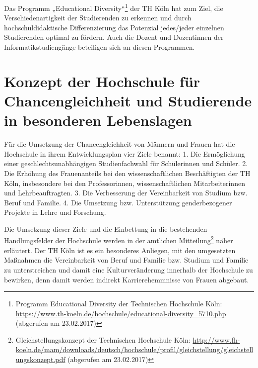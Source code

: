 Das Programm „Educational Diversity``\footnote{Programm Educational
  Diversity der Technischen Hochschule Köln:
  \url{https://www.th-koeln.de/hochschule/educational-diversity\_5710.php}
  (abgerufen am 23.02.2017)} der TH Köln hat zum Ziel, die
Verschiedenartigkeit der Studierenden zu erkennen und durch
hochschuldidaktische Differenzierung das Potenzial jedes/jeder einzelnen
Studierenden optimal zu fördern. Auch die Dozent und Dozentinnen der
Informatikstudiengänge beteiligen sich an diesen Programmen.

\section{Konzept der Hochschule für Chancengleichheit und Studierende
in besonderen
Lebenslagen}\label{konzept-der-hochschule-fuxfcr-chancengleichheit-und-studierende-in-besonderen-lebenslagen}

Für die Umsetzung der Chancengleichheit von Männern und Frauen hat die
Hochschule in ihrem Entwicklungsplan vier Ziele benannt: 1. Die
Ermöglichung einer geschlechtsunabhängigen Studienfachwahl für
Schülerinnen und Schüler. 2. Die Erhöhung des Frauenanteils bei den
wissenschaftlichen Beschäftigten der TH Köln, insbesondere bei den
Professorinnen, wissenschaftlichen Mitarbeiterinnen und
Lehrbeauftragten. 3. Die Verbesserung der Vereinbarkeit von Studium bzw.
Beruf und Familie. 4. Die Umsetzung bzw. Unterstützung genderbezogener
Projekte in Lehre und Forschung.

Die Umsetzung dieser Ziele und die Einbettung in die bestehenden
Handlungsfelder der Hochschule werden in der amtlichen
Mitteilung\footnote{Gleichstellungskonzept der Technischen Hochschule
  Köln:
  \url{http://www.fh-koeln.de/mam/downloads/deutsch/hochschule/profil/gleichstellung/gleichstellungskonzept.pdf}
  (abgerufen am 23.02.2017)} näher erläutert. Der TH Köln ist es ein
besonderes Anliegen, mit den umgesetzten Maßnahmen die Vereinbarkeit von
Beruf und Familie bzw. Studium und Familie zu unterstreichen und damit
eine Kulturveränderung innerhalb der Hochschule zu bewirken, denn damit
werden indirekt Karrierehemmnisse von Frauen abgebaut.
